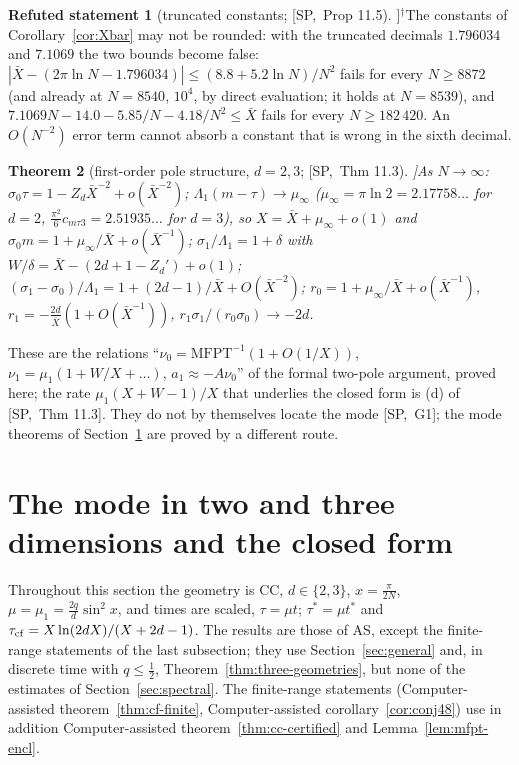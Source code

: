 \documentclass[10pt,a4paper]{article}
\theoremstyle{plain}
\newtheorem{theorem}{Theorem}[section]
\theoremstyle{definition}
\newtheorem{refuted}[theorem]{Refuted statement}
\newcommand{\NEW}{\ensuremath{^{\dagger}}}       %
\newcommand{\src}[2]{[\textsf{#1},~#2]}           %
\newcommand{\SPE}{\textsf{SP}}
\newcommand{\ASY}{\textsf{AS}}
\newcommand{\Xb}{\bar X}
\begin{document}
\begin{refuted}[truncated constants; \src{\SPE}{Prop 11.5}]\NEW\label{ref:truncated}
The constants of Corollary~\ref{cor:Xbar} may not be rounded: with the truncated decimals $1.796034$ and $7.1069$ the two bounds become false: $|\Xb-(2\pi\ln N-1.796034)|\le(8.8+5.2\ln N)/N^2$ fails for every $N\ge8872$ (and already at $N=8540$, $10^4$, by direct evaluation; it holds at $N=8539$), and $7.1069N-14.0-5.85/N-4.18/N^2\le\Xb$ fails for every $N\ge182\,420$. An $O(N^{-2})$ error term cannot absorb a constant that is wrong in the sixth decimal.
\end{refuted}

\begin{theorem}[first-order pole structure, $d=2,3$; \src{\SPE}{Thm 11.3}]\label{thm:poles}
As $N\to\infty$: $\sigma_0\tau=1-Z_d\Xb^{-2}+o(\Xb^{-2})$; $\Lambda_1(m-\tau)\to\mu_\infty$ ($\mu_\infty=\pi\ln2=2.17758\ldots$ for $d=2$, $\frac{\pi^2}6c_{m\tau3}=2.51935\ldots$ for $d=3$), so $X=\Xb+\mu_\infty+o(1)$ and $\sigma_0m=1+\mu_\infty/\Xb+o(\Xb^{-1})$; $\sigma_1/\Lambda_1=1+\delta$ with $W/\delta=\Xb-(2d+1-Z_d')+o(1)$; $(\sigma_1-\sigma_0)/\Lambda_1=1+(2d-1)/\Xb+O(\Xb^{-2})$; $r_0=1+\mu_\infty/\Xb+o(\Xb^{-1})$, $r_1=-\frac{2d}\Xb(1+O(\Xb^{-1}))$, $r_1\sigma_1/(r_0\sigma_0)\to-2d$.
\end{theorem}
These are the relations ``$\nu_0=\mathrm{MFPT}^{-1}(1+O(1/X))$, $\nu_1=\mu_1(1+W/X+\dots)$, $a_1\approx-A\nu_0$'' of the formal two-pole argument, proved here; the rate $\mu_1(X+W-1)/X$ that underlies the closed form is (d) of \src{\SPE}{Thm 11.3}. They do not by themselves locate the mode \src{\SPE}{G1}; the mode theorems of Section~\ref{sec:mode} are proved by a different route.

\section{The mode in two and three dimensions and the closed form}\label{sec:mode}

Throughout this section the geometry is CC, $d\in\{2,3\}$, $x=\frac\pi{2N}$, $\mu=\mu_1=\frac{2q}d\sin^2x$, and times are scaled, $\tau=\mu t$; $\tau^*=\mu t^*$ and $\tau_{\rm cf}=X\ln(2dX)/(X+2d-1)$. The results are those of \ASY, except the finite-range statements of the last subsection; they use Section~\ref{sec:general} and, in discrete time with $q\le\frac12$, Theorem~\ref{thm:three-geometries}, but none of the estimates of Section~\ref{sec:spectral}. The finite-range statements (Computer-assisted theorem~\ref{thm:cf-finite}, Computer-assisted corollary~\ref{cor:conj48}) use in addition Computer-assisted theorem~\ref{thm:cc-certified} and Lemma~\ref{lem:mfpt-encl}.
\end{document}
